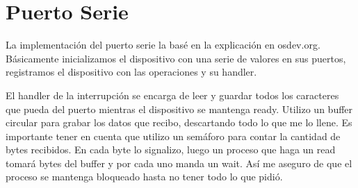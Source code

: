 \section{Puerto Serie}

La implementación del puerto serie la basé en la explicación en osdev.org.
Básicamente inicializamos el dispositivo con una serie de valores en sus
puertos, registramos el dispositivo con las operaciones y su handler.

El handler de la interrupción se encarga de leer y guardar todos los caracteres
que pueda del puerto mientras el dispositivo se mantenga ready. Utilizo un
buffer circular para grabar los datos que recibo, descartando todo lo que me lo
llene. Es importante tener en cuenta que utilizo un semáforo para contar la
cantidad de bytes recibidos. En cada byte lo signalizo, luego un proceso que
haga un read tomará bytes del buffer y por cada uno manda un wait. Así me
aseguro de que el proceso se mantenga bloqueado hasta no tener todo lo que
pidió.
